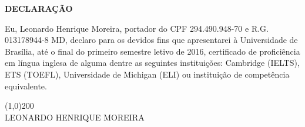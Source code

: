 \documentclass[a4paper,12pt]{article}
\begin{document}
\begin{center}
 \fontsize{14}{12}
\textbf{DECLARAÇÃO}
\end{center}

Eu, Leonardo Henrique Moreira, portador do CPF 294.490.948-70 e R.G. 013178944-8 MD, declaro para os devidos fins que 
apresentarei à Universidade de Brasília, até o final do primeiro semestre letivo de 2016, certificado de proficiência em língua 
inglesa de alguma dentre as seguintes instituições: Cambridge (IELTS), ETS (TOEFL), Universidade de Michigan (ELI) ou 
instituição de competência equivalente.
\newline

\begin{center}
  \line(1,0){200}\\
  LEONARDO HENRIQUE MOREIRA 
\end{center}
\end{document}
